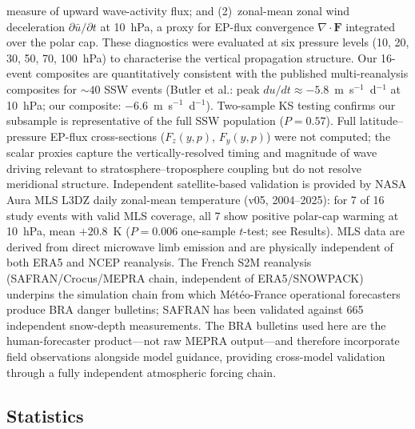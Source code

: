 \documentclass[11pt,letterpaper]{article}
\begin{document}
measure of upward wave-activity flux\cite{Polvani2004}; and (2)~zonal-mean zonal wind deceleration $\partial \bar{u}/\partial t$ at 10~hPa, a proxy for EP-flux convergence $\nabla \cdot \mathbf{F}$ integrated over the polar cap. These diagnostics were evaluated at six pressure levels (10, 20, 30, 50, 70, 100~hPa) to characterise the vertical propagation structure. Our 16-event composites are quantitatively consistent with the published multi-reanalysis composites for ${\sim}40$ SSW events (Butler et al.\cite{Butler2017}: peak $du/dt \approx -5.8$~m~s$^{-1}$~d$^{-1}$ at 10~hPa; our composite: $-6.6$~m~s$^{-1}$~d$^{-1}$). Two-sample KS testing confirms our subsample is representative of the full SSW population ($P = 0.57$). Full latitude--pressure EP-flux cross-sections ($F_z(y,p)$, $F_y(y,p)$) were not computed; the scalar proxies capture the vertically-resolved timing and magnitude of wave driving relevant to stratosphere--troposphere coupling but do not resolve meridional structure. Independent satellite-based validation is provided by NASA Aura MLS L3DZ daily zonal-mean temperature (v05, 2004--2025)\cite{Waters2006}: for 7 of 16 study events with valid MLS coverage, all 7 show positive polar-cap warming at 10~hPa, mean $+20.8$~K ($P = 0.006$ one-sample $t$-test; see Results). MLS data are derived from direct microwave limb emission and are physically independent of both ERA5 and NCEP reanalysis. The French S2M reanalysis\cite{Vernay2022} (SAFRAN/Crocus/MEPRA chain, independent of ERA5/SNOWPACK) underpins the simulation chain from which M\'et\'eo-France operational forecasters produce BRA danger bulletins; SAFRAN has been validated against 665 independent snow-depth measurements\cite{Durand2009}. The BRA bulletins used here are the human-forecaster product---not raw MEPRA output---and therefore incorporate field observations alongside model guidance, providing cross-model validation through a fully independent atmospheric forcing chain.

\subsection*{Statistics}
\end{document}
